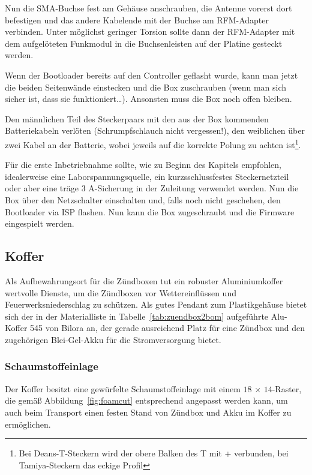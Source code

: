 \documentclass[paper=a4, parskip, numbers=noenddot, toc=listof, headsepline]{scrbook}
\begin{document}
			  Nun die SMA-Buchse fest am Gehäuse anschrauben, die Antenne vorerst dort befestigen und das andere Kabelende mit der Buchse am RFM-Adapter verbinden. Unter möglichst geringer Torsion sollte dann der RFM-Adapter mit dem aufgelöteten Funkmodul in die Buchsenleisten auf der Platine gesteckt werden.

			  Wenn der Bootloader bereits auf den Controller geflasht wurde, kann man jetzt die beiden Seitenwände einstecken und die Box zuschrauben (wenn man sich sicher ist, dass sie funktioniert\dots). Ansonsten muss die Box noch offen bleiben.

			  Den männlichen Teil des Steckerpaars mit den aus der Box kommenden Batteriekabeln verlöten (Schrumpfschlauch nicht vergessen!), den weiblichen über zwei Kabel an der Batterie, wobei jeweils auf die korrekte Polung zu achten ist\footnote{Bei Deans-T-Steckern wird der obere Balken des T mit + verbunden, bei Tamiya-Steckern das eckige Profil}.

			  Für die erste Inbetriebnahme sollte, wie zu Beginn des Kapitels empfohlen, idealerweise eine Laborspannungsquelle, ein kurzsschlussfestes Steckernetzteil oder aber eine träge 3 A-Sicherung in der Zuleitung verwendet werden. Nun die Box über den Netzschalter einschalten und, falls noch nicht geschehen, den Bootloader via ISP flashen. Nun kann die Box zugeschraubt und die
			  Firmware eingespielt werden.

		  \subsection{Koffer}

			  Als Aufbewahrungsort für die Zündboxen tut ein robuster Aluminiumkoffer wertvolle Dienste, um die Zündboxen vor Wettereinflüssen und Feuerwerks\-nieder\-schlag zu schützen. Als gutes Pendant zum Plastikgehäuse bietet sich der in der Materialliste in Tabelle~\ref{tab:zuendbox2bom} aufgeführte Alu-Koffer 545 von Bilora an, der gerade ausreichend Platz für eine Zündbox und den zugehörigen Blei-Gel-Akku für die Stromversorgung bietet.

			  \subsubsection{Schaumstoffeinlage}

				  Der Koffer besitzt eine gewürfelte Schaumstoffeinlage mit einem $18\,\times\,14$-Raster, die gemäß Abbildung~\ref{fig:foamcut} entsprechend angepasst werden kann, um auch beim Transport einen festen Stand von Zündbox und Akku im Koffer zu ermöglichen.
\end{document}
